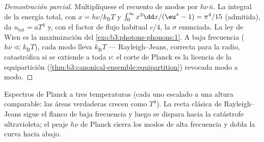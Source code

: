 \begin{proof}[Demostración parcial]
Multiplíquese el recuento de modos por $h\nu\,\bar n$. La integral de la
energía total, con $x = h\nu/k_{\text{B}}T$ y $\int_0^\infty
x^3\dd x/(\eu^x - 1) = \pi^4/15$ (admitida), da $u_{\text{tot}}
= aT^4$ y, con el factor de flujo habitual $c/4$, la
$\sigma$ enunciada. La ley de Wien es la maximización del
\cref{exo:b3:photons-phonons:1}. A baja frecuencia ($h\nu \ll
k_{\text{B}}T$), cada modo lleva $k_{\text{B}}T$ ---
Rayleigh--Jeans, correcta para la radio, catastrófica si se extiende a toda
$\nu$: el corte de Planck es la licencia de la equipartición
(\cref{thm:b3:canonical-ensemble:equipartition}) revocada
modo a modo.
\end{proof}

\begin{omfigure}

{\small Espectros de Planck a tres temperaturas (cada uno escalado a una
altura comparable: las áreas verdaderas crecen como $T^4$). La recta clásica
de Rayleigh--Jeans sigue el flanco de baja frecuencia y luego
se dispara hacia la catástrofe ultravioleta; el peaje $h\nu$ de Planck
cierra los modos de alta frecuencia y dobla la curva hacia abajo.}
\end{omfigure}

